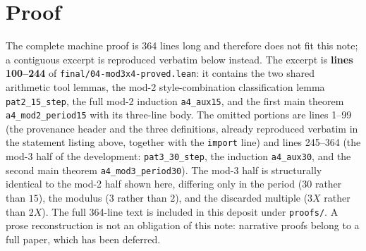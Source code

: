 \documentclass[11pt]{article}
\begin{document}
\section{Proof}
The complete machine proof is 364 lines long and therefore does not fit this note; a
contiguous excerpt is reproduced verbatim below instead. The excerpt is
\textbf{lines 100--244} of \texttt{final/04-mod3x4-proved.lean}: it contains the two shared
arithmetic tool lemmas, the mod-2 style-combination classification lemma
\texttt{pat2\_15\_step}, the full mod-2 induction \texttt{a4\_aux15}, and the first main
theorem \texttt{a4\_mod2\_period15} with its three-line body. The omitted portions are lines
1--99 (the provenance header and the three definitions, already reproduced verbatim in the
statement listing above, together with the \texttt{import} line) and lines 245--364 (the
mod-3 half of the development: \texttt{pat3\_30\_step}, the induction \texttt{a4\_aux30}, and
the second main theorem \texttt{a4\_mod3\_period30}). The mod-3 half is structurally
identical to the mod-2 half shown here, differing only in the period ($30$ rather than $15$),
the modulus ($3$ rather than $2$), and the discarded multiple ($3X$ rather than $2X$). The
full 364-line text is included in this deposit under \texttt{proofs/}. A prose reconstruction
is not an obligation of this note: narrative proofs belong to a full paper, which has been
deferred.
\end{document}
